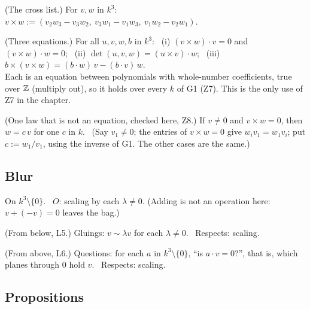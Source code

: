 \begin{lines}
\item[\lab{D1}] (The cross list.) For $v, w$ in $k^3$: \ $v \times w := (v_2 w_3 - v_3 w_2,\ v_3 w_1 - v_1 w_3,\ v_1 w_2 - v_2 w_1)$.
\item[\lab{D2}] (Three equations.) For all $u, v, w, b$ in $k^3$: \ (i) $(v \times w) \cdot v = 0$ and $(v \times w) \cdot w = 0$; \ (ii) $\det(u, v, w) = (u \times v) \cdot w$; \ (iii) $b \times (v \times w) = (b \cdot w)\, v - (b \cdot v)\, w$. \\
Each is an equation between polynomials with whole-number coefficients, true over $\mathbb{Z}$ (multiply out), so it holds over every $k$ of G1 (Z7). This is the only use of Z7 in the chapter.
\item[\lab{D3}] (One law that is not an equation, checked here, Z8.) If $v \ne 0$ and $v \times w = 0$, then $w = c\,v$ for one $c$ in $k$. \ (Say $v_1 \ne 0$; the entries of $v \times w = 0$ give $w_i v_1 = w_1 v_i$; put $c := w_1 / v_1$, using the inverse of G1. The other cases are the same.)
\end{lines}

\subsection*{Blur}

On $k^3 \setminus \{0\}$. \ $O$: scaling by each $\lambda \ne 0$. (Adding is not an operation here: $v + (-v) = 0$ leaves the bag.)

\begin{lines}
\item[\lab{B1}] (From below, L5.) Gluings: $v \sim \lambda v$ for each $\lambda \ne 0$. \ Respects: scaling.
\item[\lab{B2}] (From above, L6.) Questions: for each $a$ in $k^3 \setminus \{0\}$, ``is $a \cdot v = 0$?'', that is, which planes through $0$ hold $v$. \ Respects: scaling.
\end{lines}

\subsection*{Propositions}

